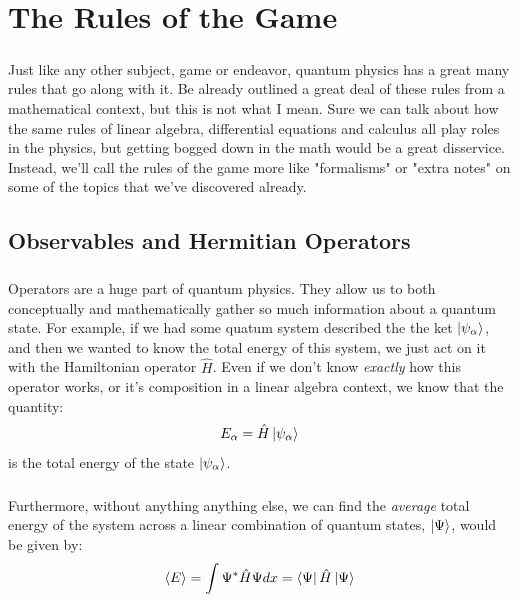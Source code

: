 \documentclass[12pt,letterpaper]{book}
\begin{document}
\chapter{The Rules of the Game}

\paragraph*{}Just like any other subject, game or endeavor, quantum physics has a great many rules that go along with it. Be already outlined a great deal of these rules from a mathematical context, but this is not what I mean. Sure we can talk about how the same rules of linear algebra, differential equations and calculus all play roles in the physics, but getting bogged down in the math would be a great disservice. Instead, we'll call the rules of the game more like "formalisms" or "extra notes" on some of the topics that we've discovered already.


\section{Observables and Hermitian Operators}

\paragraph*{}Operators are a huge part of quantum physics. They allow us to both conceptually and mathematically gather so much information about a quantum state. For example, if we had some quatum system described the the ket 
$\ket{\psi_\alpha}$, and then we wanted to know the total energy of this system, we just act on it with the Hamiltonian operator $\hat{H}$. Even if we don't know \textit{exactly} how this operator works, or it's composition in a linear algebra context, we know that the quantity:
\begin{equation}
E_\alpha = \hat{H}\ket{\psi_\alpha}
\end{equation}
is the total energy of the state $\ket{\psi_\alpha}$.
\paragraph*{}Furthermore, without anything anything else, we can find the \textit{average} total energy of the system across a linear combination of quantum states, $\ket{\Psi}$, would be given by:
\begin{equation}
\label{expect-val}
\expval{E} = \int \Psi^* \hat{H} \Psi dx = \bra{\Psi}\hat{H}\ket{\Psi}	
\end{equation}
\end{document}
